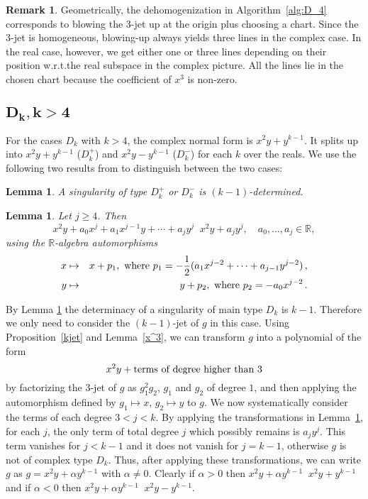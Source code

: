 \documentclass[noend]{amsproc}
\newtheorem{lemma}[theorem]{Lemma}
\theoremstyle{definition}
\newtheorem{remark}[theorem]{Remark}
\DeclareMathOperator{\requiv}{\overset{r}{\sim}}
\begin{document}
\begin{remark}
Geometrically, the dehomogenization in Algorithm~\ref{alg:D_4} corresponds to
blowing the 3-jet up at the origin plus choosing a chart. Since the 3-jet is
homogeneous, blowing-up always yields three lines in the complex case. In the
real case, however, we get either one or three lines depending on their
position w.r.t.\@ the real subspace in the complex picture. All the lines lie
in the chosen chart because the coefficient of $x^3$ is non-zero.
\end{remark}


\subsection{$\boldsymbol{D_k, k > 4}$}

For the cases $D_k$ with $k > 4$, the complex normal form is $x^2y+y^{k-1}$. It
splits up into $x^2y+y^{k-1}$ ($D_k^+$) and $x^2y-y^{k-1}$ ($D_k^-$) for each
$k$ over the reals. We use the following two results from \citet{Siersma} to
distinguish between the two cases:

\begin{lemma}\label{kDeterminacyD[k]k>4}
A singularity of type $D_k^+$ or $D_k^-$ is $(k-1)$-determined.
\end{lemma}

\begin{lemma}\label{transformationD[k]}
Let $j\ge 4$. Then
\[
x^2y+a_0x^j+a_1x^{j-1}y+\cdots+a_jy^j\requiv x^2y+a_j y^j,
\quad a_0,\ldots,a_j\in\mathbb R,
\]
using the $\mathbb R$-algebra automorphisms
\begin{eqnarray*}
x&\mapsto&x+p_1,\textnormal{ where }
p_1=-\frac{1}{2}(a_1x^{j-2}+\cdots+a_{j-1}y^{j-2})\,,\\
y&\mapsto&y+p_2,\textnormal{ where } p_2=-a_0x^{j-2} \,.
\end{eqnarray*}
\end{lemma}

By Lemma \ref{kDeterminacyD[k]k>4} the determinacy of a singularity of main
type $D_k$ is $k-1$. Therefore we only need to consider the $(k-1)$-jet of $g$
in this case. Using Proposition~\ref{kjet} and Lemma~\ref{x^3}, we can
transform $g$ into a polynomial of the form \[x^2y+\textnormal{terms of degree
higher than $3$}\] by factorizing the $3$-jet of $g$ as $g_1^2g_2$, $g_1$ and
$g_2$ of degree $1$, and then applying the automorphism defined by
$g_1\mapsto x$, $g_2\mapsto y$ to $g$. We now systematically consider the terms
of each degree $3<j<k$. By applying the transformations in
Lemma~\ref{transformationD[k]}, for each $j$, the only term of total degree $j$
which possibly remains is $a_jy^j$. This term vanishes for $j<k-1$ and it does
not vanish for $j=k-1$, otherwise $g$ is not of complex type $D_k$. Thus, after
applying these transformations, we can write $g$ as $g=x^2y+\alpha y^{k-1}$
with $\alpha \neq 0$. Clearly if $\alpha>0$ then
$x^2y+\alpha y^{k-1}\requiv x^2y+y^{k-1}$ and if
$\alpha<0$ then $x^2y+\alpha y^{k-1}\requiv x^2y-y^{k-1}$.
\end{document}
